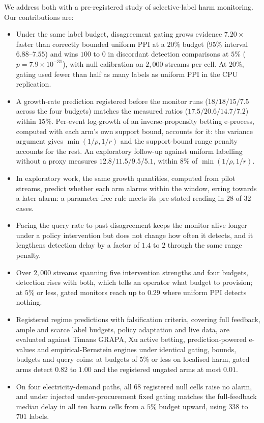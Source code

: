 We address both with a pre-registered study of selective-label harm monitoring. Our contributions are:
\begin{itemize}
\item Under the same label budget, disagreement gating grows evidence $7.20\times$ faster than correctly bounded uniform PPI at a $20\%$ budget
(95\% interval $6.88$--$7.55$) and wins $100$ to $0$ in discordant detection comparisons at $5\%$ ($p=7.9\times10^{-31}$), with null calibration on $2{,}000$ streams per cell. At $20\%$, gating used fewer than half as many labels as uniform PPI in the CPU replication.
\item A growth-rate prediction registered before the monitor runs ($18/18/15/7.5$ across the four budgets) matches the measured ratios
($17.5/20.6/14.7/7.2$) within $15\%$. Per-event log-growth of an inverse-propensity betting e-process, computed with each arm's own support bound,
accounts for it: the variance argument gives $\min(1/\rho,1/r)$ and the support-bound range penalty accounts for the rest.
An exploratory follow-up against uniform labelling without a proxy measures $12.8/11.5/9.5/5.1$, within $8\%$ of $\min(1/\rho,1/r)$.
\item In exploratory work, the same growth quantities, computed from pilot streams, predict whether each arm alarms within the window, erring towards a later alarm: a parameter-free rule meets its pre-stated reading in $28$ of $32$ cases.
\item Pacing the query rate to past disagreement keeps the monitor alive longer under a policy intervention but does not change how often it detects,
and it lengthens detection delay by a factor of $1.4$ to $2$ through the same range penalty.
\item Over $2{,}000$ streams spanning five intervention strengths and four budgets, detection rises with both,
which tells an operator what budget to provision; at $5\%$ or less, gated monitors reach up to $0.29$ where uniform PPI detects nothing.
\item Registered regime predictions with falsification criteria, covering full feedback, ample and scarce label budgets, policy adaptation and live data,
are evaluated against Timans GRAPA, Xu active betting, prediction-powered e-values and empirical-Bernstein engines under identical gating, bounds, budgets and query coins:
at budgets of $5\%$ or less on localised harm, gated arms detect $0.82$ to $1.00$ and the registered ungated arms at most $0.01$.
\item On four electricity-demand paths, all $68$ registered null cells raise no alarm, and under injected under-procurement fixed gating matches the full-feedback median delay in all ten harm cells from a $5\%$ budget upward, using $338$ to $701$ labels.
\end{itemize}

